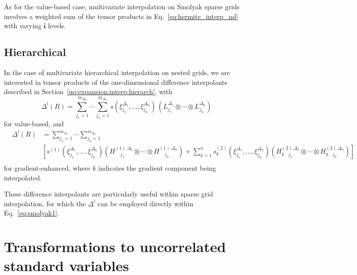 As for the value-based case, multivariate interpolation on Smolyak
sparse grids involves a weighted sum of the tensor products in
Eq.~\ref{eq:hermite_interp_nd} with varying $\boldsymbol{i}$ levels.

\subsection{Hierarchical} \label{uq:expansion:sc:hierarch}

In the case of multivariate hierarchical interpolation on nested grids, 
we are interested in tensor products of the one-dimensional difference
interpolants described in Section~\ref{uq:expansion:interp:hierarch},
with
\begin{equation}
\Delta^l(R) = \sum_{j_1=1}^{m_{\Delta_1}}\cdots\sum_{j_n=1}^{m_{\Delta_n}}
s\left(\xi^{\Delta_1}_{j_1},\dots , \xi^{\Delta_n}_{j_n}\right)\,
\left(L^{\Delta_1}_{j_1}\otimes\cdots\otimes L^{\Delta_n}_{j_n}\right)
\label{eq:hierarch_interp_nd_L}
\end{equation}
for value-based, and
\begin{eqnarray}
& \Delta^l(R) & =
\sum_{j_1=1}^{m_{\Delta_1}} \cdots \sum_{j_n=1}^{m_{\Delta_n}} \nonumber \\
& & \left[ 
s^{(1)} \left( \xi^{\Delta_1}_{j_1}, \dots, \xi^{\Delta_n}_{j_n} \right)
\left( H^{(1)~\Delta_1}_{~~~~~j_1} \otimes \cdots \otimes H^{(1)~\Delta_n}_{~~~~~j_n}
\right) + \sum_{k=1}^n s_k^{(2)} \left(\xi^{\Delta_1}_{j_1}, \dots, \xi^{\Delta_n}_{j_n}\right)
\left(H^{(2)~\Delta_1}_{k~~~~j_1}\otimes\cdots\otimes H^{(2)~\Delta_n}_{k~~~~j_n}\right) 
\right] \nonumber \\
& & 
\label{eq:hierarch_interp_nd_H}
\end{eqnarray}
for gradient-enhanced, where $k$ indicates the gradient component being
interpolated.

These difference interpolants are particularly useful within sparse
grid interpolation, for which the $\Delta^l$ can be employed directly 
within Eq.~\ref{eq:smolyak1}.


\section{Transformations to uncorrelated standard variables} \label{uq:expansion:trans}

